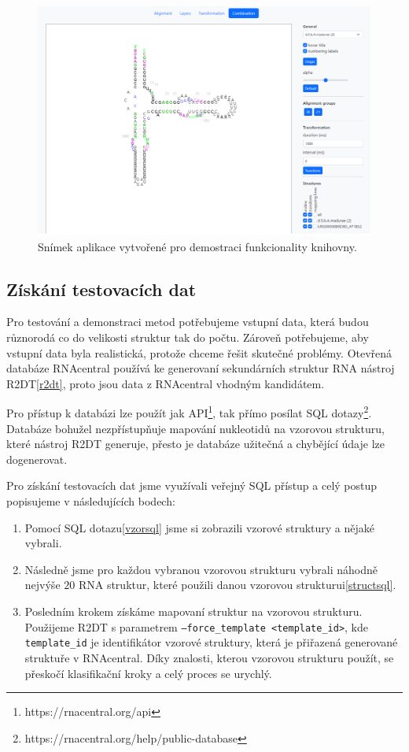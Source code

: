\begin{figure}[H]
  \centering
  \includegraphics[width=145mm]{../img/kap03/demo.png}
  \caption[Snímek aplikace vytvořené pro demostraci funkcionality
  knihovny]{Snímek aplikace vytvořené pro demostraci funkcionality knihovny.}
  \label{demobla}
\end{figure}

\subsection{Získání testovacích dat}

\sloppy

Pro testování a demonstraci metod potřebujeme vstupní data, která budou
různorodá co do velikosti struktur tak do počtu. Zároveň potřebujeme, aby
vstupní data byla realistická, protože chceme řešit skutečné problémy.
Otevřená databáze RNAcentral používá ke generovaní sekundárních struktur RNA
nástroj R2DT\ref{r2dt}, proto jsou data z RNAcentral vhodným kandidátem.

Pro přístup k databázi lze použít jak API\footnote{https://rnacentral.org/api},
tak přímo posílat SQL
dotazy\footnote{https://rnacentral.org/help/public-database}. Databáze bohužel
nezpřístupňuje mapování nukleotidů na vzorovou strukturu, které nástroj R2DT
generuje, přesto je databáze užitečná a chybějící údaje lze dogenerovat.

Pro získání testovacích dat jsme využívali veřejný SQL přístup a celý postup
popisujeme v následujících bodech:
\begin{enumerate}
  \item Pomocí SQL dotazu\ref{vzorsql} jsme si zobrazili vzorové struktury a nějaké vybrali.
  \item Následně jsme pro každou vybranou vzorovou strukturu vybrali náhodně
    nejvýše $20$ RNA struktur, které použili danou vzorovou strukturui\ref{structsql}.
  \item Posledním krokem získáme mapovaní struktur na vzorovou strukturu.
    Použijeme R2DT s parametrem \texttt{--force\_template <template\_id>}, kde
    \texttt{template\_id} je identifikátor vzorové struktury, která je
    přiřazená generované struktuře v RNAcentral. Díky znalosti, kterou vzorovou
    strukturu použít, se přeskočí klasifikační kroky a celý proces se urychlý.
\end{enumerate}

\fussy
